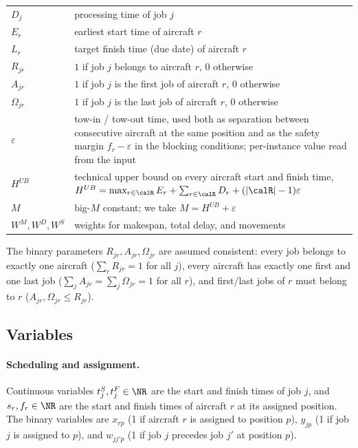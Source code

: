 \begin{tabular}{@{}l@{\quad}p{}@{}}
  $D_j$
    & processing time of job $j$ \\
  $E_r$
    & earliest start time of aircraft $r$ \\
  $L_r$
    & target finish time (due date) of aircraft $r$ \\
  $R_{jr}$
    & $1$ if job $j$ belongs to aircraft $r$, $0$ otherwise \\
  $A_{jr}$
    & $1$ if job $j$ is the first job of aircraft $r$, $0$ otherwise \\
  $\Omega_{jr}$
    & $1$ if job $j$ is the last job of aircraft $r$, $0$ otherwise \\
  $\varepsilon$
    & tow-in / tow-out time, used both as separation between consecutive
      aircraft at the same position and as the safety margin
      $f_r - \varepsilon$ in the blocking conditions; per-instance value
      read from the input \\
  $H^{UB}$
    & technical upper bound on every aircraft start and finish time,
      $H^{UB} = \max_{r \in \calR} E_r + \sum_{r \in \calR} D_r +
      (|\calR| - 1)\varepsilon$ \\
  $M$
    & big-$M$ constant; we take $M = H^{UB} + \varepsilon$ \\
  $W^M, W^D, W^S$
    & weights for makespan, total delay, and movements \\
\end{tabular}

\smallskip
\noindent
The binary parameters $R_{jr}, A_{jr}, \Omega_{jr}$ are assumed
consistent: every job belongs to exactly one aircraft
($\sum_r R_{jr} = 1$ for all $j$), every aircraft has exactly one first
and one last job ($\sum_j A_{jr} = \sum_j \Omega_{jr} = 1$ for all $r$),
and first/last jobs of $r$ must belong to $r$ ($A_{jr}, \Omega_{jr} \le
R_{jr}$).

\subsection*{Variables}

\paragraph{Scheduling and assignment.}
Continuous variables $t^S_j, t^F_j \in \NR$ are the start and finish
times of job $j$, and $s_r, f_r \in \NR$ are the start and finish times
of aircraft $r$ at its assigned position.  The binary variables are
$x_{rp}$ (1 if aircraft $r$ is assigned to position $p$),
$y_{jp}$ (1 if job $j$ is assigned to $p$), and $w_{jj'p}$ (1 if job $j$
precedes job $j'$ at position $p$).

